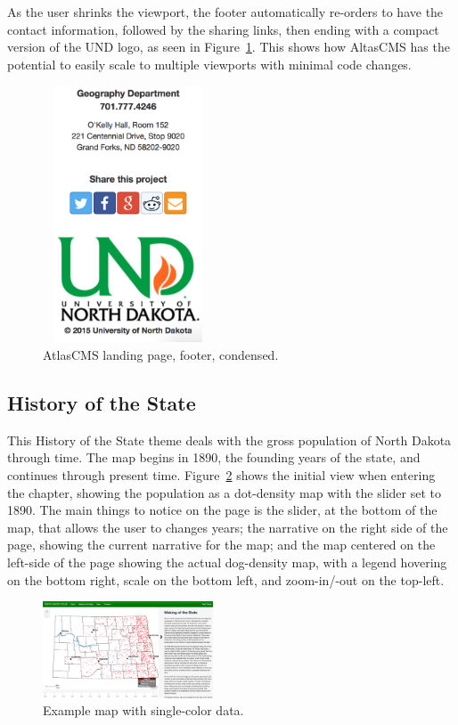 \documentclass[11pt, final, conference, twocolumn]{IEEEtran}
\begin{document}
As the user shrinks the viewport, the footer automatically re-orders to have the contact information, followed by the sharing links, then ending with a compact version of the UND logo, as seen in Figure~\ref{fig:home_bottom_small}. This shows how AltasCMS has the potential to easily scale to multiple viewports with minimal code changes.

\begin{figure}[h!]
	\centering
	\includegraphics[width=0.45\textwidth,height=3in,keepaspectratio]{home_bottom_small}
	\caption{AtlasCMS landing page, footer, condensed.}
	\label{fig:home_bottom_small}
\end{figure}

\subsection{History of the State}
This History of the State theme deals with the gross population of North Dakota through time. The map begins in 1890, the founding years of the state, and continues through present time. Figure~\ref{fig:making} shows the initial view when entering the chapter, showing the population as a dot-density map with the slider set to 1890. The main things to notice on the page is the slider, at the bottom of the map, that allows the user to changes years; the narrative on the right side of the page, showing the current narrative for the map; and the map centered on the left-side of the page showing the actual dog-density map, with a legend hovering on the bottom right, scale on the bottom left, and zoom-in/-out on the top-left.

\begin{figure}[h!]
	\centering
	\includegraphics[width=0.45\textwidth]{making}
	\caption{Example map with single-color data.}
	\label{fig:making}
\end{figure}
\end{document}
